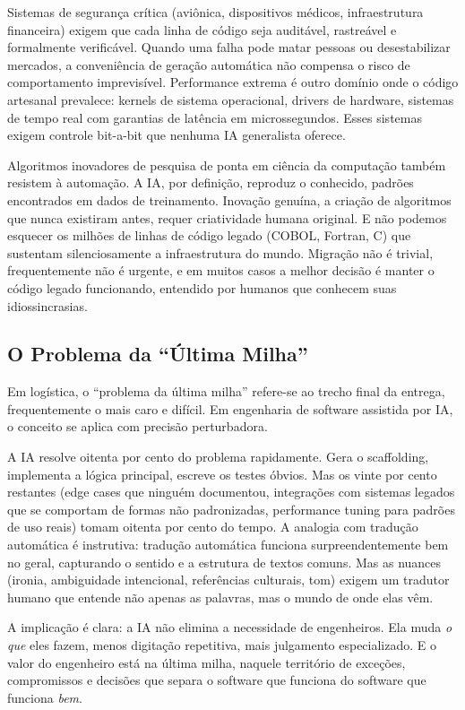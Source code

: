 Sistemas de segurança crítica (aviônica, dispositivos médicos, infraestrutura financeira) exigem que cada linha de código seja auditável, rastreável e formalmente verificável. Quando uma falha pode matar pessoas ou desestabilizar mercados, a conveniência de geração automática não compensa o risco de comportamento imprevisível. Performance extrema é outro domínio onde o código artesanal prevalece: kernels de sistema operacional, drivers de hardware, sistemas de tempo real com garantias de latência em microssegundos. Esses sistemas exigem controle bit-a-bit que nenhuma IA generalista oferece.

Algoritmos inovadores de pesquisa de ponta em ciência da computação também resistem à automação. A IA, por definição, reproduz o conhecido, padrões encontrados em dados de treinamento. Inovação genuína, a criação de algoritmos que nunca existiram antes, requer criatividade humana original. E não podemos esquecer os milhões de linhas de código legado (COBOL, Fortran, C) que sustentam silenciosamente a infraestrutura do mundo. Migração não é trivial, frequentemente não é urgente, e em muitos casos a melhor decisão é manter o código legado funcionando, entendido por humanos que conhecem suas idiossincrasias.

\subsection{O Problema da ``Última Milha''}

Em logística, o ``problema da última milha'' refere-se ao trecho final da entrega, frequentemente o mais caro e difícil. Em engenharia de software assistida por IA, o conceito se aplica com precisão perturbadora.

A IA resolve oitenta por cento do problema rapidamente. Gera o scaffolding, implementa a lógica principal, escreve os testes óbvios. Mas os vinte por cento restantes (edge cases que ninguém documentou, integrações com sistemas legados que se comportam de formas não padronizadas, performance tuning para padrões de uso reais) tomam oitenta por cento do tempo. A analogia com tradução automática é instrutiva: tradução automática funciona surpreendentemente bem no geral, capturando o sentido e a estrutura de textos comuns. Mas as nuances (ironia, ambiguidade intencional, referências culturais, tom) exigem um tradutor humano que entende não apenas as palavras, mas o mundo de onde elas vêm.

A implicação é clara: a IA não elimina a necessidade de engenheiros. Ela muda \textit{o que} eles fazem, menos digitação repetitiva, mais julgamento especializado. E o valor do engenheiro está na última milha, naquele território de exceções, compromissos e decisões que separa o software que funciona do software que funciona \textit{bem}.

